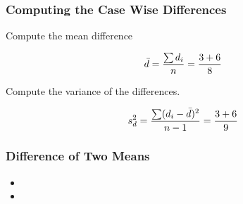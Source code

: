 \documentclass[a4]{beamer}
\begin{document}


\begin{frame}
\frametitle{Computing the Case Wise Differences}
Compute the mean difference

\[ \bar{d}  = {\sum{d_i} \over n } = { 3+6 \over 8} \]

Compute the variance of the differences.

\[ s^2_{d}  ={\sum(d_i -\bar{d})^2 \over n-1 } =  { 3+6 \over 9} \]

\end{frame}


\begin{frame}
\frametitle{Difference of Two Means}
\begin{itemize}
\item
\item
\end{itemize}
\end{frame}
\end{document}
